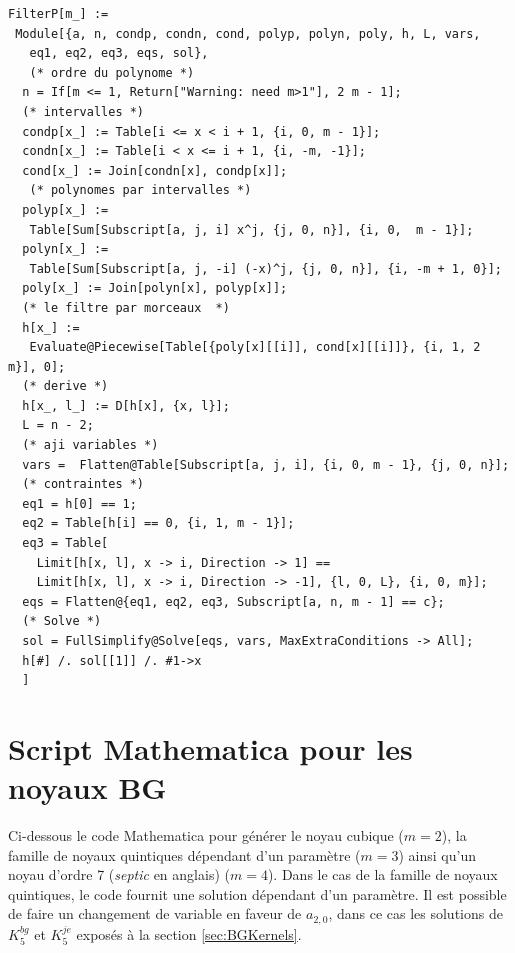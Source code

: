 \documentclass[11pt,twoside]{article}
\begin{document}
\begin{lstlisting}[language=iPython]
FilterP[m_] := 
 Module[{a, n, condp, condn, cond, polyp, polyn, poly, h, L, vars, 
   eq1, eq2, eq3, eqs, sol},
   (* ordre du polynome *)
  n = If[m <= 1, Return["Warning: need m>1"], 2 m - 1];
  (* intervalles *)
  condp[x_] := Table[i <= x < i + 1, {i, 0, m - 1}];
  condn[x_] := Table[i < x <= i + 1, {i, -m, -1}];
  cond[x_] := Join[condn[x], condp[x]];
   (* polynomes par intervalles *)
  polyp[x_] := 
   Table[Sum[Subscript[a, j, i] x^j, {j, 0, n}], {i, 0,  m - 1}];
  polyn[x_] := 
   Table[Sum[Subscript[a, j, -i] (-x)^j, {j, 0, n}], {i, -m + 1, 0}];
  poly[x_] := Join[polyn[x], polyp[x]];
  (* le filtre par morceaux  *)
  h[x_] := 
   Evaluate@Piecewise[Table[{poly[x][[i]], cond[x][[i]]}, {i, 1, 2 m}], 0];
  (* derive *)
  h[x_, l_] := D[h[x], {x, l}];
  L = n - 2;
  (* aji variables *)
  vars =  Flatten@Table[Subscript[a, j, i], {i, 0, m - 1}, {j, 0, n}];
  (* contraintes *)
  eq1 = h[0] == 1;
  eq2 = Table[h[i] == 0, {i, 1, m - 1}];
  eq3 = Table[
    Limit[h[x, l], x -> i, Direction -> 1] == 
    Limit[h[x, l], x -> i, Direction -> -1], {l, 0, L}, {i, 0, m}];
  eqs = Flatten@{eq1, eq2, eq3, Subscript[a, n, m - 1] == c};
  (* Solve *)
  sol = FullSimplify@Solve[eqs, vars, MaxExtraConditions -> All];
  h[#] /. sol[[1]] /. #1->x
  ]
\end{lstlisting}
\section{Script Mathematica pour les noyaux BG}
\label{sec:MathBG}
Ci-dessous le code Mathematica pour générer le noyau cubique ($m=2$), la famille de noyaux quintiques  dépendant d'un paramètre ($m=3$) ainsi qu'un noyau d'ordre 7 (\textit{septic} en anglais) ($m=4$). Dans le cas de la famille de noyaux quintiques, le code fournit une solution dépendant d'un paramètre. Il est possible de faire un changement de variable en faveur de $a_{2,0}$, dans ce cas les solutions de $K_5^{bg}$ et $K_5^{je}$ exposés à la section \ref{sec:BGKernels}.
\end{document}

